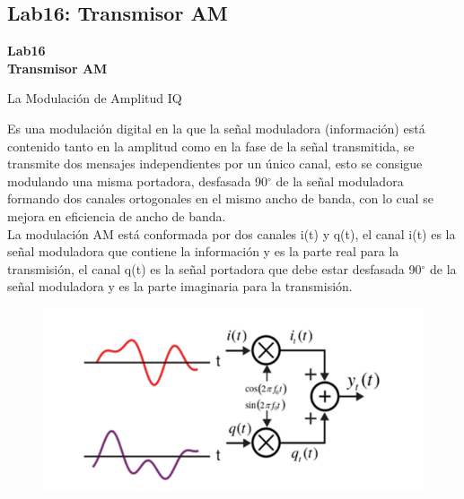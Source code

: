 \subsection{Lab16: Transmisor AM}

\begin{frame}{}


\bfseries{\textrm{\LARGE Lab16\\ \Large Transmisor AM}}
\raggedright
\end{frame}

\begin{frame}{La Modulación de Amplitud IQ}


Es una modulación digital en la que la señal moduladora (información) está contenido tanto en la amplitud como en la fase de la señal transmitida, se transmite dos mensajes independientes por un único canal, esto se consigue modulando una misma portadora, desfasada 90$^{\circ}$ de la señal moduladora formando dos canales ortogonales en el mismo ancho de banda, con lo cual se mejora en eficiencia de ancho de banda.\\
\vspace{2mm}
La modulación AM está conformada por dos canales i(t) y q(t), el canal i(t) es la señal moduladora que contiene la información y es la parte real para la transmisión, el canal q(t) es la señal portadora que debe estar desfasada 90$^{\circ}$ de la señal moduladora y es la parte imaginaria para la transmisión.

\begin{figure}[H]
\vspace{-3mm}
\includegraphics[width=.5\textwidth]{parte3/lab15/pdf/lab15_1.pdf}
\end{figure}

\end{frame}

